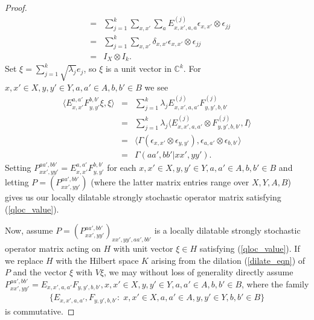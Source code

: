 \documentclass[11pt]{amsart}
\newcommand{\bb}[1]{\mathbb{#1}}
\begin{document}
\begin{proof}
\begin{eqnarray*}
& = &
\sum\limits_{j=1}^{k}\sum\limits_{x, x'}\sum\limits_{a}E_{x, x', a, a}^{(j)}\epsilon_{x, x'}\otimes \epsilon_{jj} \\
& = &
\sum\limits_{j=1}^{k}\sum\limits_{x, x'}\delta_{x, x'}\epsilon_{x, x'}\otimes \epsilon_{jj} \\
& = &
I_{X}\otimes I_{k}.
\end{eqnarray*}
\noindent Set $\xi = \sum\limits_{j=1}^{k}\sqrt{\lambda_{j}}e_{j}$, so $\xi$ is a unit vector in $\bb{C}^{k}$. For $x, x' \in X, y, y' \in Y, a, a' \in A, b, b' \in B$ we see
\begin{eqnarray*}
\langle E_{x, x'}^{a, a'}F_{y, y'}^{b, b'}\xi, \xi\rangle 
& = &
\sum\limits_{j=1}^{k}\lambda_{j}E_{x, x', a, a'}^{(j)}F_{y, y', b, b'}^{(j)} \\
& = &
\sum\limits_{j=1}^{k}\lambda_{j}\langle E_{x, x', a, a'}^{(j)}\otimes F_{y, y', b, b'}^{(j)}, I\rangle \\
& = &
\langle \Gamma(\epsilon_{x, x'}\otimes \epsilon_{y, y'}), \epsilon_{a, a'}\otimes \epsilon_{b, b'}\rangle \\
& = &
\Gamma(aa', bb'|xx', yy').
\end{eqnarray*}
\noindent Setting $P_{xx', yy'}^{aa', bb'} = E_{x, x'}^{a, a'}F_{y, y'}^{b, b'}$ for each $x, x' \in X, y, y' \in Y, a, a' \in A, b, b' \in B$ and letting $P = (P_{xx', yy'}^{aa', bb'})$ (where the latter matrix entries range over $X, Y, A, B$) gives us our locally dilatable strongly stochastic operator matrix satisfying (\ref{qloc_value}).

Now, assume $P = (P_{xx', yy'}^{aa', bb'})_{xx', yy', aa', bb'}$ is a locally dilatable strongly stochastic operator matrix acting on $H$ with unit vector $\xi \in H$ satisfying (\ref{qloc_value}). If we replace $H$ with the Hilbert space $K$ arising from the dilation (\ref{dilate_eqn}) of $P$ and the vector $\xi$ with $V\xi$, we may without loss of generality directly assume $P_{xx', yy'}^{aa', bb'} = E_{x, x', a, a'}F_{y, y', b, b'}, x, x' \in X, y, y' \in Y, a, a' \in A, b, b' \in B$, where the family
\begin{gather*}
	\{E_{x, x', a, a'}, F_{y, y', b, b'}: \; x, x' \in X, a, a' \in A, y, y' \in Y, b, b' \in B\}
\end{gather*}
\noindent is commutative. 


\end{proof}
\end{document}
